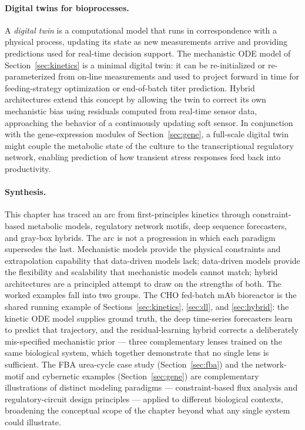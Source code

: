 \paragraph{Digital twins for bioprocesses.}
A \emph{digital twin} is a computational model that runs in correspondence with
a physical process, updating its state as new measurements arrive and providing
predictions used for real-time decision support.  The mechanistic ODE model of
Section~\ref{sec:kinetics} is a minimal digital twin: it can be re-initialized
or re-parameterized from on-line measurements and used to project forward in
time for feeding-strategy optimization or end-of-batch titer prediction.
Hybrid architectures extend this concept by allowing the twin to correct its
own mechanistic bias using residuals computed from real-time sensor data,
approaching the behavior of a continuously updating soft sensor.  In
conjunction with the gene-expression modules of Section~\ref{sec:gene}, a
full-scale digital twin might couple the metabolic state of the culture to
the transcriptional regulatory network, enabling prediction of how transient
stress responses feed back into productivity.

\paragraph{Synthesis.}
This chapter has traced an arc from first-principles kinetics through
constraint-based metabolic models, regulatory network motifs, deep sequence
forecasters, and gray-box hybrids.  The arc is not a progression in which
each paradigm supersedes the last.  Mechanistic models provide the physical
constraints and extrapolation capability that data-driven models lack;
data-driven models provide the flexibility and scalability that mechanistic
models cannot match; hybrid architectures are a principled attempt to draw
on the strengths of both.  The worked examples fall into two groups.  The CHO fed-batch mAb bioreactor
is the shared running example of Sections~\ref{sec:kinetics},
\ref{sec:dl}, and \ref{sec:hybrid}: the kinetic ODE model supplies ground
truth, the deep time-series forecasters learn to predict that trajectory,
and the residual-learning hybrid corrects a deliberately mis-specified
mechanistic prior --- three complementary lenses trained on the same
biological system, which together demonstrate that no single lens is
sufficient.  The FBA urea-cycle case study (Section~\ref{sec:fba}) and
the network-motif and cybernetic examples (Section~\ref{sec:gene}) are
complementary illustrations of distinct modeling paradigms ---
constraint-based flux analysis and regulatory-circuit design principles ---
applied to different biological contexts, broadening the conceptual scope
of the chapter beyond what any single system could illustrate.
